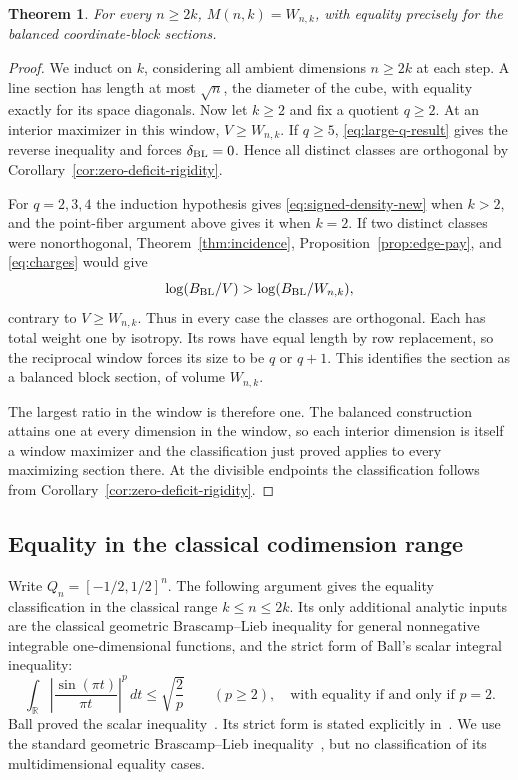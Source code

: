 \documentclass[11pt,a4paper]{article}
\newtheorem{theorem}{Theorem}[section]
\theoremstyle{remark}\newtheorem{remark}[theorem]{Remark}
\numberwithin{equation}{section}
\begin{document}
\begin{theorem}\label{thm:balanced-at-least-two}
For every \(n\ge2k\), \(M(n,k)=W_{n,k}\), with equality precisely for
the balanced coordinate-block sections.
\end{theorem}
\begin{proof}
We induct on \(k\), considering all ambient dimensions \(n\ge2k\)
at each step. A line section has length at most \(\sqrt n\), the
diameter of the cube, with equality exactly for its space diagonals.
Now let \(k\ge2\) and fix a quotient \(q\ge2\). At an interior
maximizer in this window, \(V\ge W_{n,k}\). If \(q\ge5\),
\eqref{eq:large-q-result} gives the reverse inequality and forces
\(\delta_{\rm BL}=0\). Hence all distinct classes are orthogonal
by Corollary~\ref{cor:zero-deficit-rigidity}.

For \(q=2,3,4\) the induction hypothesis gives
\eqref{eq:signed-density-new} when \(k>2\), and the point-fiber argument
above gives it when \(k=2\). If two distinct classes were nonorthogonal,
Theorem~\ref{thm:incidence}, Proposition~\ref{prop:edge-pay}, and
\eqref{eq:charges} would give
\[
  \log(B_{\rm BL}/V)>\log(B_{\rm BL}/W_{n,k}),
\]
contrary to \(V\ge W_{n,k}\). Thus in every case the classes are
orthogonal. Each has total weight one by isotropy. Its rows have equal
length by row replacement, so the reciprocal window forces its size
to be \(q\) or \(q+1\). This identifies the section as a balanced block
section, of volume \(W_{n,k}\).

The largest ratio in the window is therefore one. The balanced
construction attains one at every dimension in the window, so each
interior dimension is itself a window maximizer and the classification
just proved applies to every maximizing section there. At the divisible
endpoints the classification follows from
Corollary~\ref{cor:zero-deficit-rigidity}.

\end{proof}
\subsection{Equality in the classical codimension range}
\label{sec:q1-equality}

Write $Q_n=[-1/2,1/2]^n$.  The following argument gives the equality
classification in the classical range $k\le n\le2k$.  Its only additional
analytic inputs are the classical geometric Brascamp--Lieb inequality
for general nonnegative integrable one-dimensional functions, and the
strict form of Ball's scalar integral inequality:
\begin{equation}\label{eq:q1-strict-sinc}
 \int_{\mathbb R}\left|\frac{\sin(\pi t)}{\pi t}\right|^p\,dt
 \le\sqrt{\frac2p}\qquad(p\ge2),
 \quad\text{with equality if and only if }p=2.
\end{equation}
Ball proved the scalar inequality~\cite{Ball1986}. Its strict form
is stated explicitly in~\cite{AbiKhuzam2017}. We use the
standard geometric Brascamp--Lieb inequality~\cite{Barthe1998},
but no classification of its multidimensional equality cases.
\end{document}
